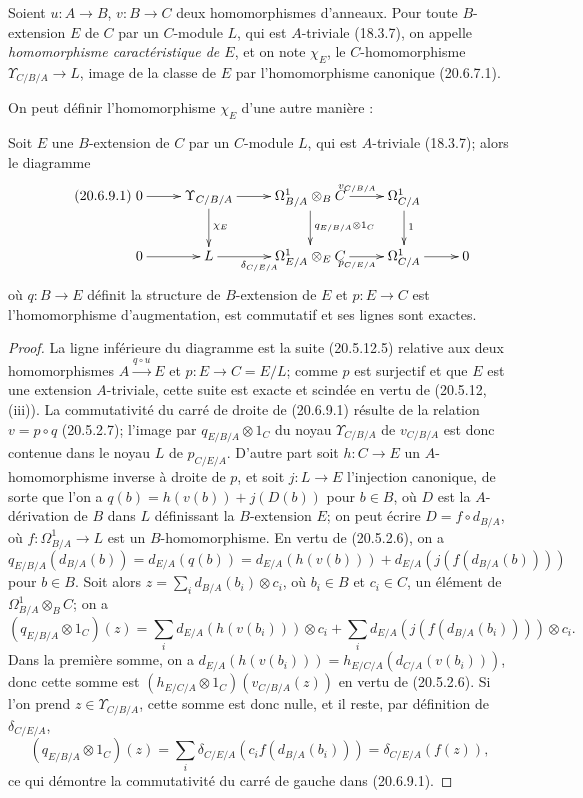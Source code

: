 \begin{definition}[20.6.8]
\label{0.20.6.8-fr}
Soient $u:A\to B$, $v:B\to C$ deux homomorphismes d'anneaux. Pour toute
$B$-extension $E$ de $C$ par un $C$-module $L$, qui est $A$-triviale
(18.3.7), on appelle \emph{homomorphisme caractéristique de $E$}, et on
note $\chi_E$, le $C$-homomorphisme $\Upsilon_{C/B/A}\to L$, image de la
classe de $E$ par l'homomorphisme canonique (20.6.7.1).
\end{definition}

On peut définir l'homomorphisme $\chi_E$ d'une autre manière :
\begin{proposition}[20.6.9]
\label{0.20.6.9-fr}
Soit $E$ une $B$-extension de $C$ par un $C$-module $L$, qui est
$A$-triviale (18.3.7); alors le diagramme
\begin{equation}
\tag{20.6.9.1}
\label{0.20.6.9.1-fr}
\xymatrix{
  0 \ar[r] & \Upsilon_{C/B/A} \ar[r] \ar[d]^{\chi_E} &
  \Omega^1_{B/A}\otimes_B C \ar[r]^{v_{C/B/A}}
    \ar[d]^{q_{E/B/A}\otimes1_C} &
  \Omega^1_{C/A} \ar[d]^{1} \\
  0 \ar[r] & L \ar[r]_{\delta_{C/E/A}} &
  \Omega^1_{E/A}\otimes_E C \ar[r]_{p_{C/E/A}} &
  \Omega^1_{C/A} \ar[r] & 0
}
\end{equation}
où $q:B\to E$ définit la structure de $B$-extension de $E$ et
$p:E\to C$ est l'homomorphisme d'augmentation, est commutatif et ses
lignes sont exactes.
\end{proposition}

\begin{proof}
La ligne inférieure du diagramme est la suite (20.5.12.5) relative aux
deux homomorphismes $A\xrightarrow{q\circ u}E$ et
$p:E\to C=E/L$; comme $p$ est surjectif et que $E$ est une extension
$A$-triviale, cette suite est exacte et scindée en vertu de (20.5.12,
(iii)). La commutativité du carré de droite de (20.6.9.1) résulte de la
relation $v=p\circ q$ (20.5.2.7); l'image par
$q_{E/B/A}\otimes1_C$ du noyau $\Upsilon_{C/B/A}$ de $v_{C/B/A}$ est
donc contenue dans le noyau $L$ de $p_{C/E/A}$. D'autre part soit
$h:C\to E$ un $A$-homomorphisme inverse à droite de $p$, et soit
$j:L\to E$ l'injection canonique, de sorte que l'on a
$q(b)=h(v(b))+j(D(b))$ pour $b\in B$, où $D$ est la $A$-dérivation de
$B$ dans $L$ définissant la $B$-extension $E$; on peut écrire
$D=f\circ d_{B/A}$, où $f:\Omega^1_{B/A}\to L$ est un
$B$-homomorphisme. En vertu de (20.5.2.6), on a
\[
  q_{E/B/A}(d_{B/A}(b))=d_{E/A}(q(b))
  =d_{E/A}(h(v(b)))+d_{E/A}(j(f(d_{B/A}(b))))
\]
pour $b\in B$. Soit alors
$z=\sum_i d_{B/A}(b_i)\otimes c_i$, où $b_i\in B$ et $c_i\in C$, un
élément de $\Omega^1_{B/A}\otimes_B C$; on a
\[
  (q_{E/B/A}\otimes1_C)(z)=
  \sum_i d_{E/A}(h(v(b_i)))\otimes c_i+
  \sum_i d_{E/A}(j(f(d_{B/A}(b_i))))\otimes c_i.
\]
Dans la première somme, on a
$d_{E/A}(h(v(b_i)))=h_{E/C/A}(d_{C/A}(v(b_i)))$, donc cette somme est
$(h_{E/C/A}\otimes1_C)(v_{C/B/A}(z))$ en vertu de (20.5.2.6). Si l'on
prend $z\in\Upsilon_{C/B/A}$, cette somme est donc nulle, et il reste,
par définition de $\delta_{C/E/A}$,
\[
  (q_{E/B/A}\otimes1_C)(z)=
  \sum_i\delta_{C/E/A}(c_i f(d_{B/A}(b_i)))
  =\delta_{C/E/A}(f(z)),
\]
ce qui démontre la commutativité du carré de gauche dans (20.6.9.1).
\end{proof}

